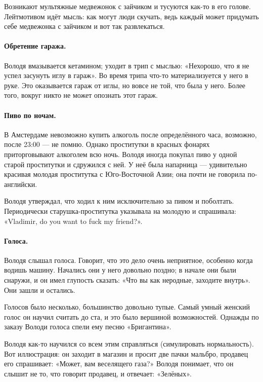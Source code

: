 \documentclass{book}
\begin{document}
Возникают мультяжные медвежонок с зайчиком и тусуются как-то в его голове.
Лейтмотивом идёт мысль: как могут люди скучать, ведь каждый может придумать себе медвежонка с зайчиком и вот так развлекаться.

\paragraph{Обретение гаража.}
Володя вмазывается кетамином; уходит в трип с мыслью: «Нехорошо, что я не успел засунуть иглу в гараж».
Во время трипа что-то материализуется у него в руке.
Это оказывается гараж от иглы, но вовсе не той, что была у него.
Более того, вокруг никто не может опознать этот гараж.

\paragraph{Пиво по ночам.}
В Амстердаме невозможно купить алкоголь после определённого часа, возможно, после 23:00 --- не помню.
Однако проститутки в красных фонарях приторговывают алкоголем всю ночь.
Володя иногда покупал пиво у одной старой проститутки и сдружился с ней.
У неё была напарница --- удивительно красивая молодая проститутка с Юго-Восточной Азии; она почти не говорила по-английски.

Володя утверждал, что ходил к ним исключительно за пивом и поболтать.
Периодически старушка-проститутка указывала на молодую и спрашивала: «Vladimir, do you want to fuck my friend?».

\paragraph{Голоса.}
Володя слышал голоса.
Говорит, что это дело очень неприятное, особенно когда водишь машину.
Начались они у него довольно поздно;
в начале они были снаружи, и он имел глупость сказать: «Что вы как неродные, заходите внутрь».
Они зашли и остались.

Голосов было несколько, большинство довольно тупые.
Самый умный женский голос он научил считать до ста, и это было вершиной возможностей.
Однажды по заказу Володи голоса спели ему песню «Бригантина».

Володя как-то научился со всем этим справляться (симулировать нормальность).
Вот иллюстрация: он заходит в магазин и просит две пачки мальбро, продавец его спрашивает: «Может, вам веселящего газа?»
Володя понимает, что он слышит не то, что говорит продавец, и отвечает: «Зелёных».
\end{document}
